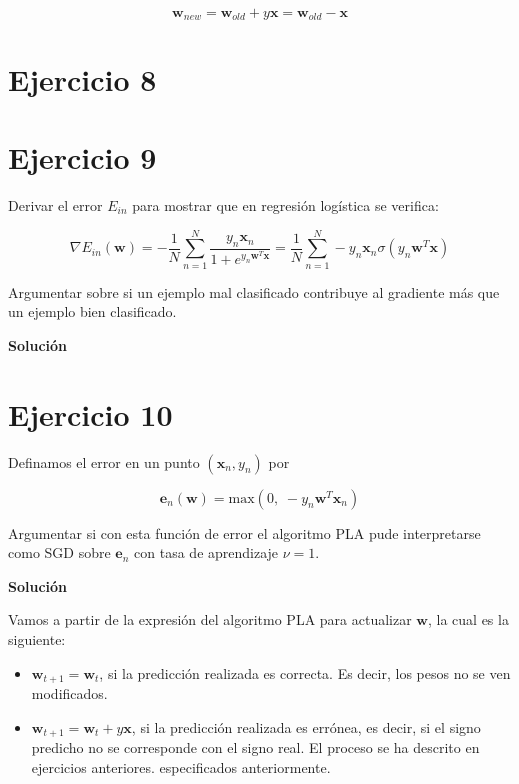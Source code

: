 \documentclass[11pt,a4paper]{article}
\newcommand{\answer}{\noindent\textbf{Solución}}
\newcommand{\maximum}{\text{max}}
\begin{document}
\begin{equation}
	\mathbf{w}_{new} = \mathbf{w}_{old} + y\mathbf{x} = \mathbf{w}_{old} - \mathbf{x}
\end{equation}

\section*{Ejercicio 8}

\section*{Ejercicio 9}

\noindent Derivar el error $E_{in}$ para mostrar que en regresión logística se verifica:

\[\nabla E_{in}(\mathbf{w}) = -\frac{1}{N} \displaystyle \sum_{n=1}^N \frac{y_n\mathbf{x}_n}{1 +
e^{y_n\mathbf{w}^T\mathbf{x}}} = \frac{1}{N} \displaystyle \sum_{n=1}^N -y_n \mathbf{x}_n \sigma (y_n\mathbf{w}^T\mathbf{x})\]

\noindent Argumentar sobre si un ejemplo mal clasificado contribuye al gradiente más que un ejemplo bien clasificado.

\answer


\section*{Ejercicio 10}

\noindent Definamos el error en un punto $(\mathbf{x}_n, y_n)$ por

\[\mathbf{e}_n(\mathbf{w}) = \maximum(0, \; -y_n\mathbf{w}^T\mathbf{x}_n)\] 

\noindent Argumentar si con esta función de error el algoritmo PLA pude interpretarse como SGD sobre $\mathbf{e}_n$ con tasa
de aprendizaje $\nu = 1$.

\answer

Vamos a partir de la expresión del algoritmo PLA para actualizar $\mathbf{w}$, la cual es la siguiente:

\begin{itemize}
	\item $\mathbf{w}_{t+1} = \mathbf{w}_{t}$, si la predicción realizada es correcta. Es decir, los pesos no se ven
	modificados.
	\item $\mathbf{w}_{t+1} = \mathbf{w}_{t} + y\mathbf{x}$, si la predicción realizada es errónea, es decir, si el signo
	predicho no se corresponde con el signo real. El proceso se ha descrito en ejercicios anteriores.
	especificados anteriormente.
\end{itemize}
\end{document}
